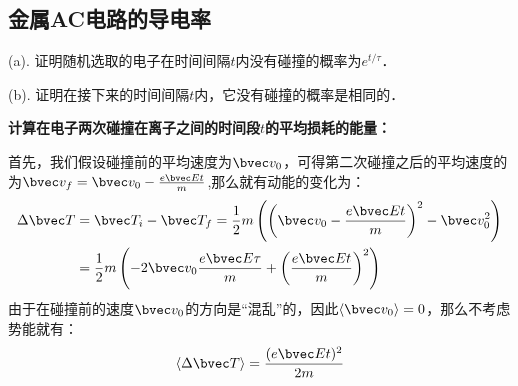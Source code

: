 \subsection{金属AC电路的导电率}
\begin{example}{}
(a). 证明随机选取的电子在时间间隔$t$内没有碰撞的概率为$e^{t/\tau}$．

(b). 证明在接下来的时间间隔$t$内，它没有碰撞的概率是相同的．
\end{example}
\begin{example}{}
\textbf{计算在电子两次碰撞在离子之间的时间段$t$的平均损耗的能量：}

首先，我们假设碰撞前的平均速度为$\bvec v_0$，可得第二次碰撞之后的平均速度的为$\bvec v_f=\bvec v_0 -\frac{e\bvec E t}{m}$,那么就有动能的变化为：
\begin{align}
\Delta \bvec T &= \bvec T_i-\bvec T_f=\frac{1}{2}m\left(\left(\bvec v_0 -\frac{e\bvec E t}{m}\right)^2-\bvec v_0^2\right)\\
&=\frac{1}{2}m\left(-2\bvec v_0\frac{e\bvec E \tau}{m}+\left(\frac{e\bvec E t}{m}\right)^2\right)\\
\end{align}
由于在碰撞前的速度$\bvec v_0$的方向是“混乱”的，因此$\langle \bvec v_0\rangle = 0$，那么不考虑势能就有：
\begin{equation}
\langle \Delta \bvec T \rangle = \frac{(e\bvec E t)^2}{2m}
\end{equation}
\end{example}
